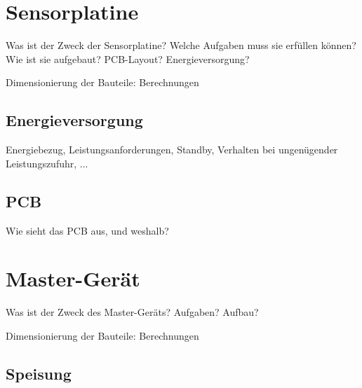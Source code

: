 \clearpage
\section{Sensorplatine}
\label{sec:hw:sensorplatine}

Was  ist der  Zweck  der Sensorplatine? Welche  Aufgaben  muss sie  erf\"ullen
k\"onnen? Wie ist sie aufgebaut? PCB-Layout? Energieversorgung?

\anweisung Dimensionierung der Bauteile: Berechnungen

\subsection{Energieversorgung}
\label{subsec:sensor:pcb}

Energiebezug,  Leistungsanforderungen, Standby,  Verhalten bei  ungen\"ugender
Leistungszufuhr, ...


\subsection{PCB}
\label{subsec:sensor:pcb}

Wie sieht das PCB aus, und weshalb?

\section{Master-Ger\"at}
\label{sec:hw:mastergerat}

Was ist der Zweck des Master-Ger\"ats? Aufgaben? Aufbau?

\anweisung Dimensionierung der Bauteile: Berechnungen


\subsection{Speisung}
\label{subsec:mastergerat:speisung}

